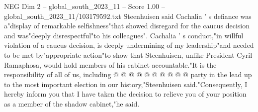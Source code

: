 \begin{textsample}{NEG Dim 2 – global\_south\_2023\_11 – Score 1.00 – global\_south\_2023\_11/103179592.txt}
Steenhuisen said Cachalia ' s defiance was a"display of remarkable selfishness"that showed disregard for the caucus decision and was"deeply disrespectful"to his colleagues".
Cachalia ' s conduct,"in willful violation of a caucus decision, is deeply undermining of my leadership"and needed to be met by"appropriate action"to show that Steenhuisen, unlike President Cyril Ramaphosa, would hold members of his cabinet accountable."It is the responsibility of all of us, including @ @ @ @ @ @ @ @ @ @ party in the lead up to the most important election in our history,"Steenhuisen said."Consequently, I hereby inform you that I have taken the decision to relieve you of your position as a member of the shadow cabinet,"he said.

\end{textsample}
